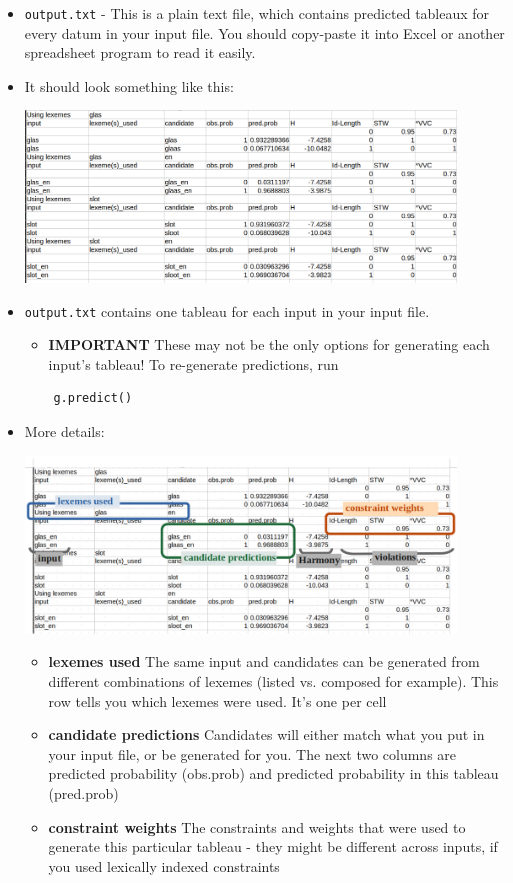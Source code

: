 \documentclass[12]{article}
\begin{document}
\begin{itemize}
	\item \texttt{output.txt} - This is a plain text file, which contains predicted tableaux for every datum in your input file.  You should copy-paste it into Excel or another spreadsheet program to read it easily.
	\item[] It should look something like this:

\includegraphics[width=0.9\textwidth]{embeddedImages/outputFile.png}

	\item[] \texttt{output.txt} contains one tableau for each input in your input file.
	\begin{itemize}
		\item[] {\bf IMPORTANT} These may not be the only options for generating each input's tableau!  To re-generate predictions, run
	\end{itemize}

\begin{verbatim}
	g.predict()
\end{verbatim}


	\item[] More details:
	
\includegraphics[width=0.9\textwidth]{embeddedImages/outputFileMarkedup.png}
	\begin{itemize}
		\item[] {\bf lexemes used} The same input and candidates can be generated from different combinations of lexemes (listed vs. composed for example).  This row tells you which lexemes were used.  It's one per cell
		\item[] {\bf candidate predictions} Candidates will either match what you put in your input file, or be generated for you.  The next two columns are predicted probability (obs.prob) and predicted probability in this tableau (pred.prob)
		\item[] {\bf constraint weights} The constraints and weights that were used to generate this particular tableau - they might be different across inputs, if you used lexically indexed constraints
	\end{itemize}



\end{itemize}
\end{document}
